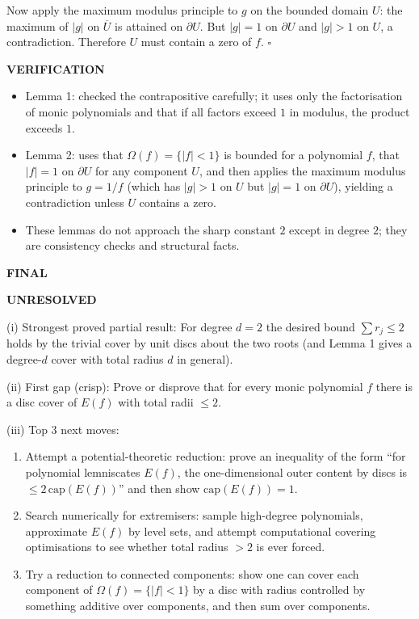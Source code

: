 Now apply the maximum modulus principle to $g$ on the bounded domain $U$: the maximum of $|g|$ on $\overline{U}$ is attained on $\partial U$. But $|g|=1$ on $\partial U$ and $|g|>1$ on $U$, a contradiction. Therefore $U$ must contain a zero of $f$.
\hfill$\square$

\medskip
\noindent\textbf{VERIFICATION}

\begin{itemize}
\item Lemma 1: checked the contrapositive carefully; it uses only the factorisation of monic polynomials and that if all factors exceed $1$ in modulus, the product exceeds $1$.
\item Lemma 2: uses that $\Omega(f)=\{|f|<1\}$ is bounded for a polynomial $f$, that $|f|=1$ on $\partial U$ for any component $U$, and then applies the maximum modulus principle to $g=1/f$ (which has $|g|>1$ on $U$ but $|g|=1$ on $\partial U$), yielding a contradiction unless $U$ contains a zero.
\item These lemmas do not approach the sharp constant $2$ except in degree $2$; they are consistency checks and structural facts.
\end{itemize}

\medskip
\noindent\textbf{FINAL}

\textbf{UNRESOLVED}

(i) Strongest proved partial result: For degree $d=2$ the desired bound $\sum r_j\le 2$ holds by the trivial cover by unit discs about the two roots (and Lemma 1 gives a degree-$d$ cover with total radius $d$ in general).

(ii) First gap (crisp): Prove or disprove that for every monic polynomial $f$ there is a disc cover of $E(f)$ with total radii $\le 2$.

(iii) Top 3 next moves:
\begin{enumerate}
\item Attempt a potential-theoretic reduction: prove an inequality of the form ``for polynomial lemniscates $E(f)$, the one-dimensional outer content by discs is $\le 2\,\mathrm{cap}(E(f))$'' and then show $\mathrm{cap}(E(f))=1$.
\item Search numerically for extremisers: sample high-degree polynomials, approximate $E(f)$ by level sets, and attempt computational covering optimisations to see whether total radius $>2$ is ever forced.
\item Try a reduction to connected components: show one can cover each component of $\Omega(f)=\{|f|<1\}$ by a disc with radius controlled by something additive over components, and then sum over components.
\end{enumerate}

